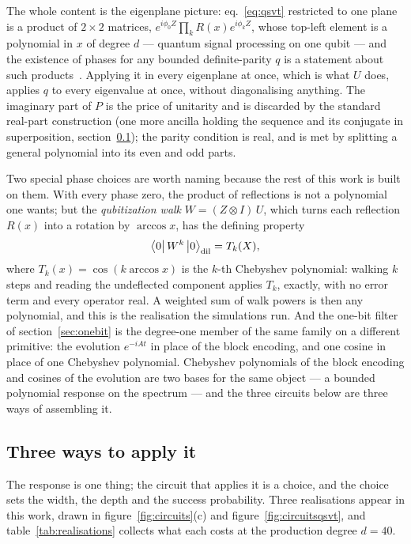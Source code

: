 \documentclass[11pt,a4paper]{article}
\begin{document}
The whole content is the eigenplane picture: eq.~\eqref{eq:qsvt}
restricted to one plane is a product of $2\times2$ matrices,
$e^{i\phi_0Z}\prod_k R(x)e^{i\phi_kZ}$, whose top-left element is a
polynomial in $x$ of degree $d$ --- quantum signal processing on one qubit
--- and the existence of phases for any bounded definite-parity $q$ is a
statement about such products~\cite{lowchuang2019,gslw2019}. Applying it
in every eigenplane at once, which is what $U$ does, applies $q$ to every
eigenvalue at once, without diagonalising anything. The imaginary part of
$P$ is the price of unitarity and is discarded by the standard real-part
construction (one more ancilla holding the sequence and its conjugate in
superposition, section~\ref{sec:qsvt:realisations}); the parity condition
is real, and is met by splitting a general polynomial into its even and odd
parts.

Two special phase choices are worth naming because the rest of this work is
built on them. With every phase zero, the product of reflections is not a
polynomial one wants; but the \emph{qubitization walk}
$W=(Z\otimes I)\,U$, which turns each reflection $R(x)$ into a rotation by
$\arccos x$, has the defining property
\begin{equation}
\big\langle 0\big|\,W^{k}\,\big|0\big\rangle_{\rm dil}=T_{k}(X),
\label{eq:walkcheb}
\end{equation}
where $T_k(x)=\cos(k\arccos x)$ is the $k$-th Chebyshev polynomial: walking
$k$ steps and reading the undeflected component applies $T_k$, exactly,
with no error term and every operator real. A weighted sum of walk powers
is then any polynomial, and this is the realisation the simulations run.
And the one-bit filter of section~\ref{sec:onebit} is the degree-one
member of the same family on a different primitive: the evolution
$e^{-iAt}$ in place of the block encoding, and one cosine in place of one
Chebyshev polynomial. Chebyshev polynomials of the block encoding and
cosines of the evolution are two bases for the same object --- a bounded
polynomial response on the spectrum --- and the three circuits below are
three ways of assembling it.

\subsection{Three ways to apply it}
\label{sec:qsvt:realisations}

The response is one thing; the circuit that applies it is a choice, and
the choice sets the width, the depth and the success probability. Three
realisations appear in this work, drawn in figure~\ref{fig:circuits}(c)
and figure~\ref{fig:circuitsqsvt}, and table~\ref{tab:realisations}
collects what each costs at the production degree $d=40$.
\end{document}
